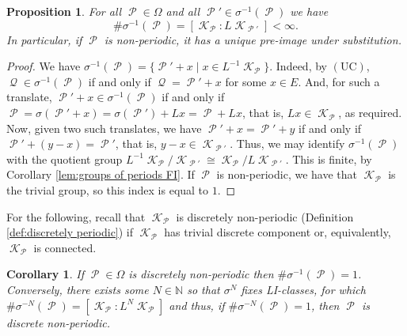 \documentclass[11pt]{amsart}
\numberwithin{equation}{section}
\theoremstyle{plain}
\newtheorem{proposition}[theorem]{Proposition}
\newtheorem{corollary}[theorem]{Corollary}
\theoremstyle{definition}
\newcommand{\N}{\mathbb N}
\newcommand{\sub}{\sigma}
\DeclareMathOperator{\cP}{\mathcal{P}}
\DeclareMathOperator{\cQ}{\mathcal{Q}}
\DeclareMathOperator{\cK}{\mathcal{K}}
\newcommand{\UC}{\(\mathrm{(UC)}\)}
\begin{document}
\begin{proposition}\label{prop:number of pre-images}
For all \(\cP \in \Omega\) and all \(\cP' \in \sub^{-1}(\cP)\) we have
\[
\# \sub^{-1}(\cP) = [\cK_{\cP} : L \cK_{\cP'}] < \infty .
\]
In particular, if \(\cP\) is non-periodic, it has a unique pre-image under substitution.
\end{proposition}

\begin{proof}
We have \(\sub^{-1}(\cP) = \{\cP' + x \mid x \in L^{-1} \cK_{\cP} \}\). Indeed, by \UC, \(\cQ \in \sub^{-1}(\cP)\) if and only if \(\cQ = \cP' + x\) for some \(x \in E\). And, for such a translate, \(\cP' + x \in \sub^{-1}(\cP)\) if and only if \(\cP = \sub(\cP'+x) = \sub(\cP')+Lx = \cP+Lx\), that is, \(Lx \in \cK_{\cP}\), as required. Now, given two such translates, we have \(\cP'+x = \cP' + y\) if and only if \(\cP' + (y-x) = \cP'\), that is, \(y-x \in \cK_{\cP'}\). Thus, we may identify \(\sub^{-1}(\cP)\) with the quotient group \(L^{-1}\cK_{\cP} / \cK_{\cP'} \cong \cK_{\cP} / L \cK_{\cP'}\). This is finite, by Corollary \ref{lem:groups of periods FI}. If \(\cP\) is non-periodic, we have that \(\cK_{\cP}\) is the trivial group, so this index is equal to \(1\).
\end{proof}

For the following, recall that \(\cK_{\cP}\) is discretely non-periodic (Definition \ref{def:discretely periodic}) if \(\cK_{\cP}\) has trivial discrete component or, equivalently, \(\cK_{\cP}\) is connected.

\begin{corollary}\label{cor:uniqueness of pre-images}
If \(\cP \in \Omega\) is discretely non-periodic then \(\# \sub^{-1}(\cP) = 1\). Conversely, there exists some \(N \in \N\) so that \(\sub^N\) fixes LI-classes, for which \(\# \sub^{-N}(\cP) = [\cK_{\cP} : L^N \cK_{\cP}]\) and thus, if \(\# \sub^{-N}(\cP) = 1\), then \(\cP\) is discrete non-periodic.
\end{corollary}
\end{document}
